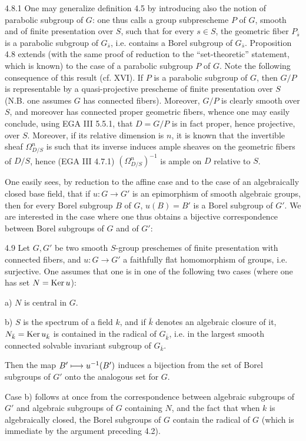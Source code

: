 \begin{remarks}{4.8.1}\label{XIV.4.8.1}
One may generalize definition 4.5 by introducing
also the notion of parabolic subgroup of $G$:
one thus calls a group subprescheme $P$ of
$G$, smooth and of finite presentation over
$S$, such that for every $s\in S$, the
geometric fiber $P_{\bar s}$ is a parabolic
subgroup of $G_{\bar s}$, i.e. contains a
Borel subgroup of $G_{\bar s}$. Proposition
4.8 extends (with the same proof of reduction
to the ``set-theoretic'' statement, which is
known) to the case of a parabolic subgroup
$P$ of $G$. Note the following consequence
of this result (cf. XVI). If $P$ is a
parabolic subgroup of $G$, then $G/P$ is
representable by a quasi-projective prescheme
of finite presentation over $S$ (N.B. one
assumes $G$ has connected fibers). Moreover,
$G/P$ is clearly smooth over $S$, and
moreover has connected proper geometric
fibers, whence one may easily conclude,
using EGA III 5.5.1, that $D=G/P$ is in
fact proper, hence projective, over $S$.
Moreover, if its relative dimension is
$n$, it is known that the invertible
sheaf $\Omega^n_{D/S}$ is such that its
inverse induces ample sheaves on the
geometric fibers of $D/S$, hence
(EGA III 4.7.1) $(\Omega^n_{D/S})^{-1}$
is ample on $D$ relative to $S$.
\end{remarks}

One easily sees, by reduction to the
affine case and to the case of an
algebraically closed base field, that
if $u:G\to G'$ is an epimorphism of
smooth algebraic groups, then for
every Borel subgroup $B$ of $G$,
$u(B)=B'$ is a Borel subgroup of $G'$.
We are interested in the case where
one thus obtains a bijective
correspondence between Borel subgroups
of $G$ and of $G'$:

\begin{proposition}{4.9}\label{XIV.4.9}
Let $G,G'$ be two smooth $S$-group
preschemes of finite presentation
with connected fibers, and
$u:G\to G'$ a faithfully flat
homomorphism of groups, i.e.
surjective.
One assumes that one is in one
of the following two cases
(where one has set $N=\operatorname{Ker} u$):

\noindent a) $N$ is central in $G$.

\noindent b) $S$ is the spectrum
of a field $k$, and if $\bar k$
denotes an algebraic closure of
it, $N_{\bar k}=\operatorname{Ker} u_{\bar k}$
is contained in the radical of
$G_{\bar k}$, i.e. in the
largest smooth connected solvable
invariant subgroup of $G_{\bar k}$.

Then the map $B'\longmapsto u^{-1}(B')$
induces a bijection from the set
of Borel subgroups of $G'$ onto
the analogous set for $G$.
\end{proposition}
Case b) follows at once from the
correspondence between algebraic
subgroups of $G'$ and algebraic
subgroups of $G$ containing $N$,
and the fact that when $k$ is
algebraically closed, the Borel
subgroups of $G$ contain the
radical of $G$ (which is immediate
by the argument preceding 4.2).

